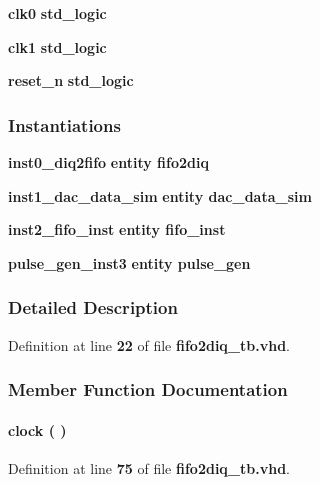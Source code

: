 \begin{DoxyCompactItemize}
\item 
{\bf clk0} {\bfseries \textcolor{comment}{std\+\_\+logic}\textcolor{vhdlchar}{ }} 
\item 
{\bf clk1} {\bfseries \textcolor{comment}{std\+\_\+logic}\textcolor{vhdlchar}{ }} 
\item 
{\bf reset\+\_\+n} {\bfseries \textcolor{comment}{std\+\_\+logic}\textcolor{vhdlchar}{ }} 
\end{DoxyCompactItemize}
\subsubsection*{Instantiations}
 \begin{DoxyCompactItemize}
\item 
{\bf inst0\+\_\+diq2fifo}  {\bfseries entity fifo2diq}   
\item 
{\bf inst1\+\_\+dac\+\_\+data\+\_\+sim}  {\bfseries entity dac\+\_\+data\+\_\+sim}   
\item 
{\bf inst2\+\_\+fifo\+\_\+inst}  {\bfseries entity fifo\+\_\+inst}   
\item 
{\bf pulse\+\_\+gen\+\_\+inst3}  {\bfseries entity pulse\+\_\+gen}   
\end{DoxyCompactItemize}


\subsubsection{Detailed Description}


Definition at line {\bf 22} of file {\bf fifo2diq\+\_\+tb.\+vhd}.



\subsubsection{Member Function Documentation}
\paragraph[{clock}]{\setlength{\rightskip}{0pt plus 5cm} {\bfseries \textcolor{vhdlchar}{ }} clock ( ) \hspace{0.3cm}{\ttfamily [Process]}}\label{classfifo2diq__tb_1_1tb__behave_af761a67e9d7ce9e23381088b6f2ae893}


Definition at line {\bf 75} of file {\bf fifo2diq\+\_\+tb.\+vhd}.

